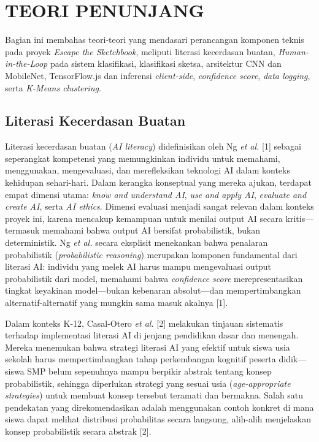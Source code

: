 \section{TEORI PENUNJANG}
\label{sec:teori-penunjang}

Bagian ini membahas teori-teori yang mendasari perancangan komponen teknis pada proyek \textit{Escape the Sketchbook}, meliputi literasi kecerdasan buatan, \textit{Human-in-the-Loop} pada sistem klasifikasi, klasifikasi sketsa, arsitektur CNN dan MobileNet, TensorFlow.js dan inferensi \textit{client-side}, \textit{confidence score}, \textit{data logging}, serta \textit{K-Means clustering}.

\subsection{Literasi Kecerdasan Buatan}
\label{subsec:literasi-kb}

Literasi kecerdasan buatan (\textit{AI literacy}) didefinisikan oleh Ng \textit{et al.} [1] sebagai seperangkat kompetensi yang memungkinkan individu untuk memahami, menggunakan, mengevaluasi, dan merefleksikan teknologi AI dalam konteks kehidupan sehari-hari. Dalam kerangka konseptual yang mereka ajukan, terdapat empat dimensi utama: \textit{know and understand AI}, \textit{use and apply AI}, \textit{evaluate and create AI}, serta \textit{AI ethics}. Dimensi evaluasi menjadi sangat relevan dalam konteks proyek ini, karena mencakup kemampuan untuk menilai output AI secara kritis—termasuk memahami bahwa output AI bersifat probabilistik, bukan deterministik. Ng \textit{et al.} secara eksplisit menekankan bahwa penalaran probabilistik (\textit{probabilistic reasoning}) merupakan komponen fundamental dari literasi AI: individu yang melek AI harus mampu mengevaluasi output probabilistik dari model, memahami bahwa \textit{confidence score} merepresentasikan tingkat keyakinan model—bukan kebenaran absolut—dan mempertimbangkan alternatif-alternatif yang mungkin sama masuk akalnya [1].

Dalam konteks K-12, Casal-Otero \textit{et al.} [2] melakukan tinjauan sistematis terhadap implementasi literasi AI di jenjang pendidikan dasar dan menengah. Mereka menemukan bahwa strategi literasi AI yang efektif untuk siswa usia sekolah harus mempertimbangkan tahap perkembangan kognitif peserta didik—siswa SMP belum sepenuhnya mampu berpikir abstrak tentang konsep probabilistik, sehingga diperlukan strategi yang sesuai usia (\textit{age-appropriate strategies}) untuk membuat konsep tersebut teramati dan bermakna. Salah satu pendekatan yang direkomendasikan adalah menggunakan contoh konkret di mana siswa dapat melihat distribusi probabilitas secara langsung, alih-alih menjelaskan konsep probabilistik secara abstrak [2].

